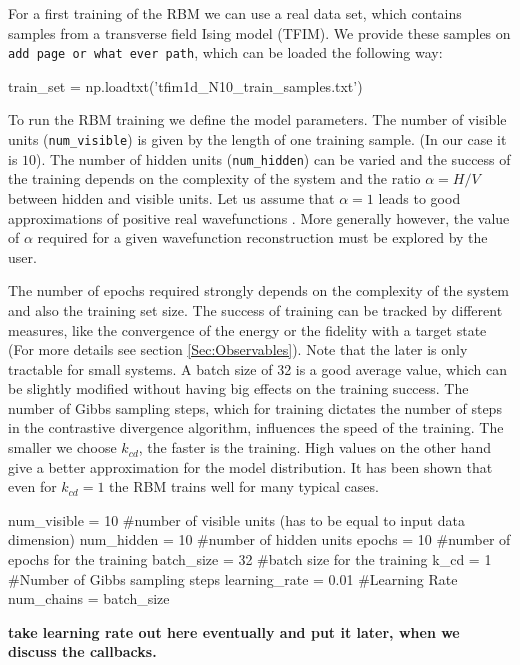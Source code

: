 \documentclass[submission, Phys]{SciPost}
\begin{document}
For a first training of the RBM we can use a real data set, which contains samples from a transverse field Ising model (TFIM). We provide these samples on \verb|add page or what ever path|, which can be loaded the following way:

\begin{python}
train_set =  np.loadtxt('tfim1d_N10_train_samples.txt')
\end{python}

To run the RBM training we define the model parameters. The number of visible units (\verb|num_visible|) is given by the length of one training sample. (In our case it is $10$). 
The number of hidden units (\verb|num_hidden|) can be varied and the success of the training depends on the complexity of the system and the ratio $\alpha = H/V$ between hidden and visible units. Let us assume that $\alpha = 1$ leads to good approximations of positive real wavefunctions \cite{Torlai2016thermo}.  More generally however, the value of $\alpha$ required for a given wavefunction reconstruction must be explored by the user.

The number of epochs required strongly depends on the complexity of the system and also the training set size. The success of training can be tracked by different measures, like the convergence of the energy or the fidelity with a target state (For more details see section \ref{Sec:Observables}). Note that the later is only tractable for small systems. A batch size of 32 is a good average value, which can be slightly modified without having big effects on the training success. The number of Gibbs sampling steps,
which for training dictates the number of steps in the contrastive divergence algorithm, 
influences the speed of the training. The smaller we choose $k_{cd}$, the faster is the training. High values on the other hand give a better approximation for the model distribution. It has been shown that even for $k_{cd}=1$ the RBM trains well for many typical cases\cite{hinton2002training}.

\begin{python}
num_visible = 10 #number of visible units (has to be equal to input data dimension)
num_hidden = 10 #number of hidden units
epochs = 10 #number of epochs for the training
batch_size = 32 #batch size for the training
k_cd = 1 #Number of Gibbs sampling steps
learning_rate = 0.01 #Learning Rate
num_chains = batch_size
\end{python}

\textbf{take learning rate out here eventually and put it later, when we discuss the callbacks.}
\end{document}

